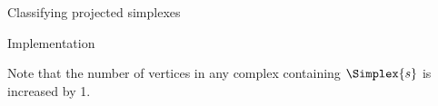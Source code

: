 \begin{plSection}{Classifying projected simplexes}
\begin{plSection}{Implementation}
\begin{enumerate}
Note that the number of vertices in any complex containing $\Simplex{s}$
is increased by 1.

\end{enumerate}

\end{plSection}%
\end{plSection}%

